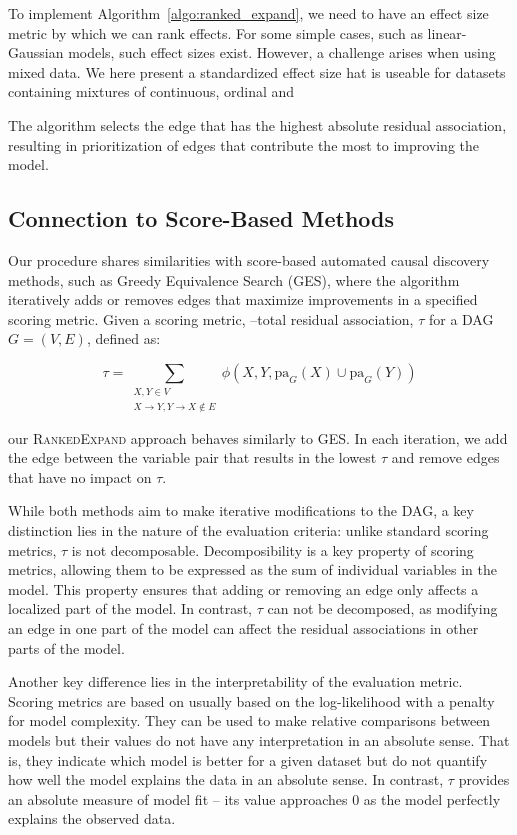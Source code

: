 \documentclass{uai2025} %
\begin{document}
To implement Algorithm~\ref{algo:ranked_expand}, we need to have an effect size 
metric by which we can rank effects. For some simple cases, such as 
linear-Gaussian models, such effect sizes exist. However, a challenge arises
when using mixed data. We here present a standardized effect size hat 
is useable for datasets containing mixtures of continuous, ordinal and 

The
algorithm selects the edge that has the highest absolute residual association,
resulting in prioritization of edges that contribute the most to improving the
model.


\subsection{Connection to Score-Based Methods}


Our procedure shares similarities with score-based automated causal discovery
methods, such as Greedy Equivalence Search (GES), where the algorithm
iteratively adds or removes edges that maximize improvements in a specified
scoring metric. Given a scoring metric, --total residual association, $ \tau $ for 
a DAG $ G = (V, E) $, defined as:

\begin{equation}
	\tau = \sum_{\substack{X, Y \in V \\ X \rightarrow Y, Y \rightarrow X \not \in E}}   \phi(X, Y, \mathrm{pa}_G(X) \cup \mathrm{pa}_G(Y))
\end{equation}

our \textsc{RankedExpand} approach behaves similarly to GES. In each iteration,
we add the edge between the variable pair that results in the lowest $ \tau $
and remove edges that have no impact on $ \tau $.

While both methods aim to make iterative modifications to the DAG, a key
distinction lies in the nature of the evaluation criteria: unlike standard
scoring metrics, $ \tau $ is not decomposable. Decomposibility is a key
property of scoring metrics, allowing them to be expressed as the sum of
individual variables in the model. This property ensures that adding or
removing an edge only affects a localized part of the model. In contrast, $
\tau $ can not be decomposed, as modifying an edge in one part of the model can
affect the residual associations in other parts of the model.

Another key difference lies in the interpretability of the evaluation metric.
Scoring metrics are based on usually based on the log-likelihood with a penalty
for model complexity. They can be used to make relative comparisons between
models but their values do not have any interpretation in an absolute sense.
That is, they indicate which model is better for a given dataset but do not
quantify how well the model explains the data in an absolute sense. In
contrast, $ \tau $ provides an absolute measure of model fit -- its value
approaches $ 0 $ as the model perfectly explains the observed data.
\end{document}
